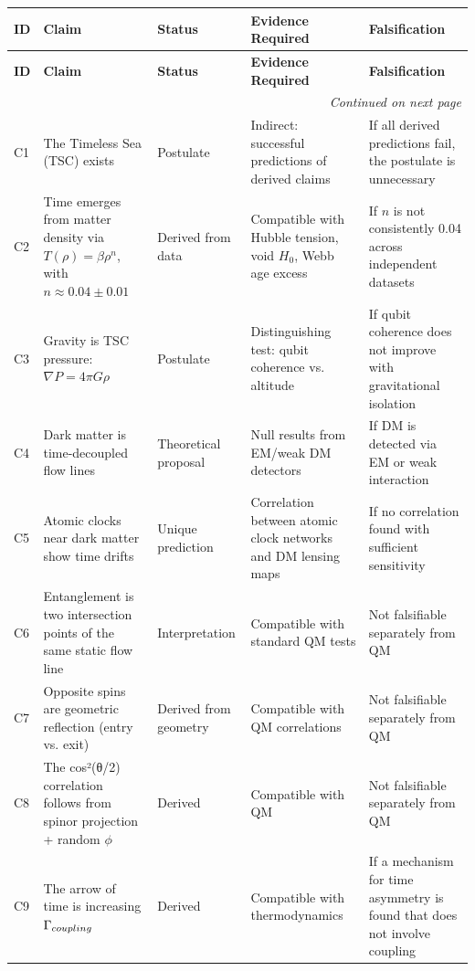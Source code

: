 \documentclass[11pt,a4paper]{article}
\let\cos\relax \let\sin\relax \let\tan\relax \let\exp\relax \let\log\relax
\let\text\relax \let\mathrm\relax \let\mathbf\relax \let\mathcal\relax
\def\texorpdfstring#1#2{#2}
\begin{document}
\begin{longtable}{@{} l >{\RaggedRight\arraybackslash}p{4.1cm} >{\RaggedRight\arraybackslash}p{2.0cm} >{\RaggedRight\arraybackslash}p{2.6cm} >{\RaggedRight\arraybackslash}p{3.0cm} @{}}
\toprule
\textbf{ID} & \textbf{Claim} & \textbf{Status} & \textbf{Evidence Required} & \textbf{Falsification} \\
\midrule
\endfirsthead
\toprule
\textbf{ID} & \textbf{Claim} & \textbf{Status} & \textbf{Evidence Required} & \textbf{Falsification} \\
\midrule
\endhead
\midrule
\multicolumn{5}{r}{\textit{Continued on next page}} \\
\endfoot
\bottomrule
\endlastfoot
C1 & The Timeless Sea (TSC) exists & Postulate & Indirect: successful predictions of derived claims & If all derived predictions fail, the postulate is unnecessary \\
C2 & Time emerges from matter density via $T(\rho)= \beta\rho^n$, with $n \approx 0.04 \pm 0.01$ & Derived from data & Compatible with Hubble tension, void $H_0$, Webb age excess & If $n$ is not consistently 0.04 across independent datasets \\
C3 & Gravity is TSC pressure: $\nabla P= 4\pi G \rho$ & Postulate & Distinguishing test: qubit coherence vs. altitude & If qubit coherence does not improve with gravitational isolation \\
C4 & Dark matter is time-decoupled flow lines & Theoretical proposal & Null results from EM/weak DM detectors & If DM is detected via EM or weak interaction \\
C5 & Atomic clocks near dark matter show time drifts & Unique prediction & Correlation between atomic clock networks and DM lensing maps & If no correlation found with sufficient sensitivity \\
C6 & Entanglement is two intersection points of the same static flow line & Interpretation & Compatible with standard QM tests & Not falsifiable separately from QM \\
C7 & Opposite spins are geometric reflection (entry vs. exit) & Derived from geometry & Compatible with QM correlations & Not falsifiable separately from QM \\
C8 & The \texorpdfstring{$\cos^2(\theta/2)$}{cos²(θ/2)} correlation follows from spinor projection + random $\phi$ & Derived & Compatible with QM & Not falsifiable separately from QM \\
C9 & The arrow of time is increasing $\Gamma_{\text{coupling}}$ & Derived & Compatible with thermodynamics & If a mechanism for time asymmetry is found that does not involve coupling \\

\end{longtable}
\end{document}

